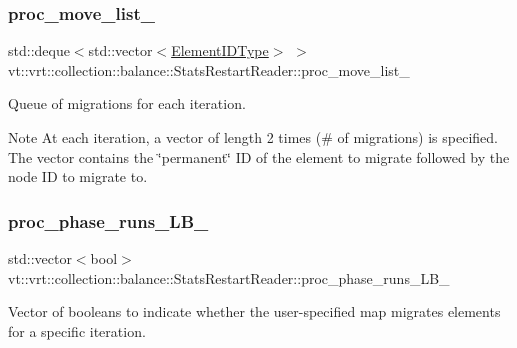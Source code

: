 \subsubsection{\texorpdfstring{proc\+\_\+move\+\_\+list\+\_\+}{proc\_move\_list\_}}
{\footnotesize\ttfamily std\+::deque$<$std\+::vector$<$\hyperlink{namespacevt_1_1vrt_1_1collection_1_1balance_a14c8d2c972f2913aa3f1636e5be0a120}{Element\+I\+D\+Type}$>$ $>$ vt\+::vrt\+::collection\+::balance\+::\+Stats\+Restart\+Reader\+::proc\+\_\+move\+\_\+list\+\_\+\hspace{0.3cm}{\ttfamily [private]}}



Queue of migrations for each iteration. 

\begin{DoxyNote}{Note}
At each iteration, a vector of length 2 times (\# of migrations) is specified. The vector contains the \char`\"{}permanent\char`\"{} ID of the element to migrate followed by the node ID to migrate to. 
\end{DoxyNote}
\mbox{\label{structvt_1_1vrt_1_1collection_1_1balance_1_1_stats_restart_reader_a52d652c1465e46f12d5915bc98dc618b}} 
\subsubsection{\texorpdfstring{proc\+\_\+phase\+\_\+runs\+\_\+\+L\+B\+\_\+}{proc\_phase\_runs\_LB\_}}
{\footnotesize\ttfamily std\+::vector$<$bool$>$ vt\+::vrt\+::collection\+::balance\+::\+Stats\+Restart\+Reader\+::proc\+\_\+phase\+\_\+runs\+\_\+\+L\+B\+\_\+\hspace{0.3cm}{\ttfamily [private]}}



Vector of booleans to indicate whether the user-\/specified map migrates elements for a specific iteration. 

\mbox{\label{structvt_1_1vrt_1_1collection_1_1balance_1_1_stats_restart_reader_ad4039b19a32b7269be28d2a66322c7e3}} 
